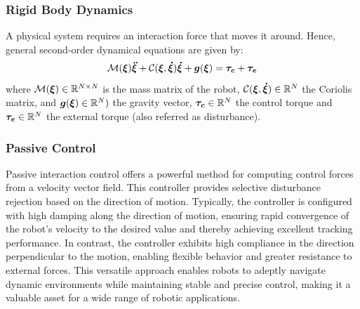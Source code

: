 \subsubsection{Rigid Body Dynamics}
A physical system requires an interaction force that moves it around. Hence, general second-order dynamical equations are given by:
\begin{equation}
\matd{M}(\vecs\xi)\vecs{\ddot\xi} + \matd{C}(\vecs\xi, \vecs{\dot\xi})\vecs{\dot\xi} + \vect g(\vecs\xi) = \vecs{\tau_c} + \vecs{\tau_e}
 \label{eq:robot_dynamics}
\end{equation}
where $\mathcal{M}(\boldsymbol{\xi}) \in \mathbb{R}^{N \times N}$ is the mass matrix of the robot, $\mathcal{C}(\boldsymbol{\xi},\boldsymbol{\dot\xi}) \in \mathbb{R}^N$ the Coriolis matrix, and  $\boldsymbol{g}(\boldsymbol{\xi}) \in \mathbb{R}^N)$ the gravity vector, $\boldsymbol{\tau_c} \in \mathbb{R}^N$ the control torque and $\boldsymbol{\tau_e} \in \mathbb{R}^N$ the external torque (also referred as disturbance).

\subsubsection{Passive Control}
Passive interaction control \cite{kronander2015passive} offers a powerful method for computing control forces from a velocity vector field. This controller provides selective disturbance rejection based on the direction of motion. Typically, the controller is configured with high damping along the direction of motion, ensuring rapid convergence of the robot's velocity to the desired value and thereby achieving excellent tracking performance. In contrast, the controller exhibits high compliance in the direction perpendicular to the motion, enabling flexible behavior and greater resistance to external forces. This versatile approach enables robots to adeptly navigate dynamic environments while maintaining stable and precise control, making it a valuable asset for a wide range of robotic applications.

